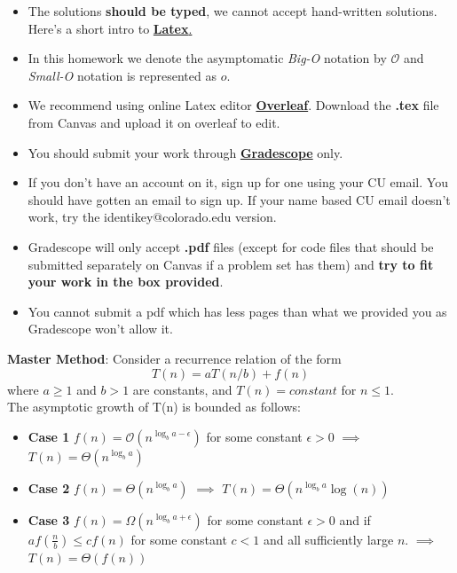 \documentclass[12pt]{article}
\begin{document}
\begin{small}
\begin{itemize}
	\item The solutions \textbf{should be typed}, we cannot accept hand-written solutions. Here's a short intro to \href{http://ece.uprm.edu/~caceros/latex/introduction.pdf}{\textbf{Latex}.}
	 \item In this homework we denote the asymptomatic \textit{Big-O} notation by $\mathcal{O}$ and \textit{Small-O} notation is represented as $o$. 
	\item We recommend using online Latex editor \href{https://www.overleaf.com/}{\textbf{Overleaf}}. Download the \textbf{.tex} file from Canvas and upload it on overleaf to edit.
	\item You should submit your work through \href{https://www.gradescope.com}{\textbf{Gradescope}}  only.
	\item If you don't have an account on it, sign up for one using your CU email. You should have gotten an email to sign up. If your name based CU email doesn't work, try the identikey@colorado.edu version. 
	\item Gradescope will only accept \textbf{.pdf} files (except for code files that should be submitted separately on Canvas if a problem set has them) and \textbf{try to fit your work in the box provided}. 
	\item You cannot submit a pdf which has less pages than what we provided you as Gradescope won't allow it.
   
\end{itemize}
\vspace{-4mm} 
\end{small}




\textbf{Master Method}: Consider a recurrence relation of the form \\
\begin{equation*}
    T(n)  = aT(n/b) + f(n)
\end{equation*}
where $a \ge 1$ and $b > 1$ are constants, and $T(n) = constant$ for $n \le 1$. \\
The asymptotic growth of T(n) is bounded as follows: 
\begin{itemize}
    \item \textbf{Case 1} $f(n) = \mathcal{O}(n^{\log_ba - \epsilon})$ for some constant $\epsilon>0$ $\implies$ $T(n) = \Theta(n^{\log_ba})$
    \item \textbf{Case 2} $f(n) = \Theta(n^{\log_ba})$  $\implies$ $T(n) = \Theta(n^{\log_ba} \log(n))$
    \item \textbf{Case 3} $f(n) = \Omega(n^{\log_ba +\epsilon})$ for some constant $\epsilon>0$ and if $af(\frac{n}{b}) \le c f(n)$ for some constant $c<1$ and all sufficiently large $n$. $\implies$ $T(n) = \Theta(f(n))$
\end{itemize}
\end{document}
